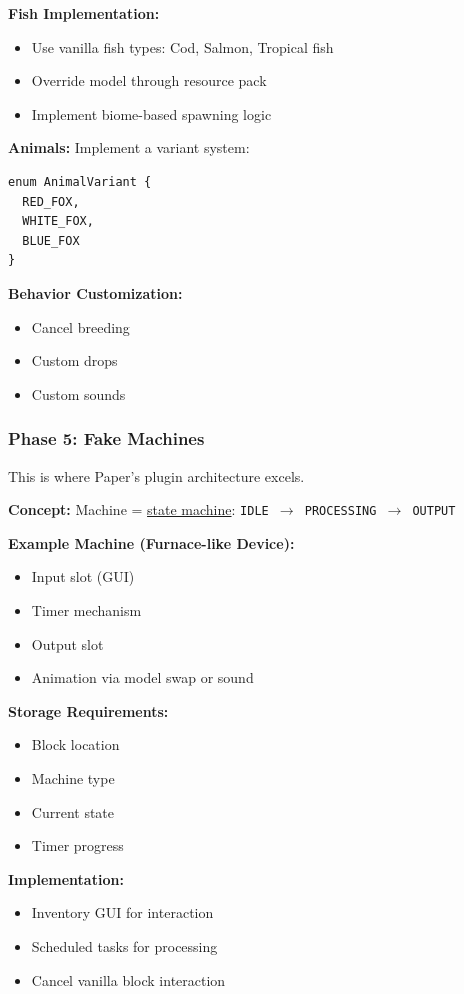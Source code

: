 \documentclass{article}
\begin{document}
\textbf{Fish Implementation:}
\begin{itemize}
    \item Use vanilla fish types: Cod, Salmon, Tropical fish
    \item Override model through resource pack
    \item Implement biome-based spawning logic
\end{itemize}

\textbf{Animals:}
Implement a variant system:

\begin{verbatim}
enum AnimalVariant {
  RED_FOX,
  WHITE_FOX,
  BLUE_FOX
}
\end{verbatim}

\textbf{Behavior Customization:}
\begin{itemize}
    \item Cancel breeding
    \item Custom drops
    \item Custom sounds
\end{itemize}

\subsubsection{Phase 5: Fake Machines}

This is where Paper's plugin architecture excels.

\textbf{Concept:}
Machine = \uline{state machine}: \texttt{IDLE $\rightarrow$ PROCESSING $\rightarrow$ OUTPUT}

\textbf{Example Machine (Furnace-like Device):}
\begin{itemize}
    \item Input slot (GUI)
    \item Timer mechanism
    \item Output slot
    \item Animation via model swap or sound
\end{itemize}

\textbf{Storage Requirements:}
\begin{itemize}
    \item Block location
    \item Machine type
    \item Current state
    \item Timer progress
\end{itemize}

\textbf{Implementation:}
\begin{itemize}
    \item Inventory GUI for interaction
    \item Scheduled tasks for processing
    \item Cancel vanilla block interaction
\end{itemize}
\end{document}
